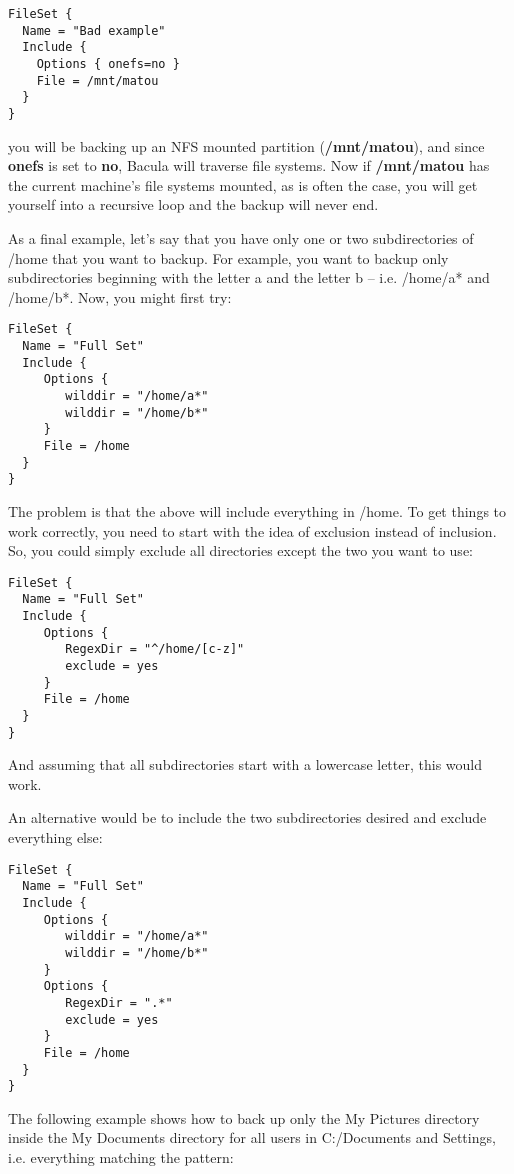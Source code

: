 \footnotesize
\begin{verbatim}
FileSet {
  Name = "Bad example"
  Include {
    Options { onefs=no }
    File = /mnt/matou
  }
}
\end{verbatim}
\normalsize

you will be backing up an NFS mounted partition ({\bf /mnt/matou}), and since
{\bf onefs} is set to {\bf no}, Bacula will traverse file systems. Now if {\bf
/mnt/matou} has the current machine's file systems mounted, as is often the
case, you will get yourself into a recursive loop and the backup will never
end. 

As a final example, let's say that you have only one or two 
subdirectories of /home that you want to backup.  For example,
you want to backup only subdirectories beginning with the letter
a and the letter b -- i.e. /home/a* and /home/b*.  Now, you might first
try:
\footnotesize
\begin{verbatim}
FileSet {
  Name = "Full Set"
  Include {
     Options {
        wilddir = "/home/a*"
        wilddir = "/home/b*"
     }
     File = /home
  }
}
\end{verbatim}
\normalsize

The problem is that the above will include everything in /home.  To get
things to work correctly, you need to start with the idea of exclusion
instead of inclusion.  So, you could simply exclude all directories
except the two you want to use:
\footnotesize
\begin{verbatim}
FileSet {
  Name = "Full Set"
  Include {
     Options {
        RegexDir = "^/home/[c-z]"
        exclude = yes
     }
     File = /home
  }
}
\end{verbatim}
\normalsize

And assuming that all subdirectories start with a lowercase letter, this
would work.

An alternative would be to include the two subdirectories desired and
exclude everything else:
\footnotesize
\begin{verbatim}
FileSet {
  Name = "Full Set"
  Include {
     Options {
        wilddir = "/home/a*"
        wilddir = "/home/b*"
     }
     Options {
        RegexDir = ".*"
        exclude = yes
     }
     File = /home
  }
}
\end{verbatim}
\normalsize


The following example shows how to back up only the My Pictures directory inside
the My Documents directory for all users in C:/Documents and Settings, i.e.
everything matching the pattern:

